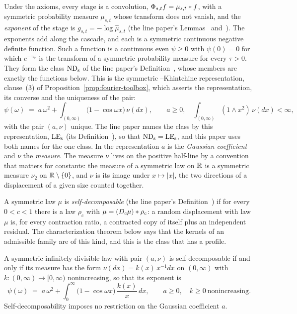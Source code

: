Under the axioms, every stage is a convolution, $\Phi_{s,t} f = \mu_{s,t} * f$, with a
symmetric probability measure $\mu_{s,t}$ whose transform does not vanish, and the
\emph{exponent} of the stage is $g_{s,t} = -\log\hat\mu_{s,t}$ (the line paper's
Lemmas~ and~). The
exponents add along the cascade, and each is a symmetric continuous negative definite
function. Such a function is a continuous even $\psi \ge 0$ with $\psi(0) = 0$ for which
$e^{-\tau\psi}$ is the transform of a symmetric probability measure for every $\tau > 0$.
They form the class $\mathrm{ND}_{\mathrm{s}}$ of the line paper's Definition~,
whose members are exactly the functions below. This is the symmetric \Levy--Khintchine
representation, clause~(3) of Proposition~\ref{prop:fourier-toolbox}, which asserts the
representation, its converse and the uniqueness of the pair:
\begin{equation}\label{eq:levy-khintchine}
  \psi(\omega) \;=\; a\,\omega^2 + \int_{(0,\infty)} \bigl(1 - \cos\omega x\bigr)\,\nu(dx),
  \qquad a \ge 0, \quad \int_{(0,\infty)} (1 \wedge x^2)\,\nu(dx) < \infty,
\end{equation}
with the pair $(a,\nu)$ unique. The line paper names the class by this representation,
$\mathrm{LE}_{\mathrm{s}}$ (its Definition~), so that $\mathrm{ND}_{\mathrm{s}} = \mathrm{LE}_{\mathrm{s}}$, and this paper
uses both names for the one class. In the representation $a$ is the
\emph{Gaussian coefficient} and $\nu$ the \emph{\Levy{} measure}. The measure $\nu$ lives on
the positive half-line by a convention that matters for constants: the \Levy{} measure of a
symmetric law on $\mathbb{R}$ is a symmetric measure $\nu_2$ on $\mathbb{R} \setminus \{0\}$, and $\nu$ is
its image under $x \mapsto |x|$, the two directions of a displacement of a given size counted
together.

A symmetric law $\mu$ is \emph{self-decomposable} (the line paper's
Definition~) if for every $0 < c < 1$ there is a law $\rho_c$ with
$\mu = (D_{c}\mu) * \rho_c$: a random displacement with law $\mu$ is, for every contraction
ratio, a contracted copy of itself plus an independent residual. The characterization theorem
below says that the kernels of an admissible family are of this kind, and this is the class
that has a profile.

\begin{proposition}\label{prop:sd-exponents}
A symmetric infinitely divisible law with pair $(a,\nu)$ is self-decomposable if and only if
its \Levy{} measure has the form $\nu(dx) = k(x)\,x^{-1}dx$ on $(0,\infty)$ with
$k : (0,\infty) \to [0,\infty)$ nonincreasing, so that its exponent is
\begin{equation}\label{eq:sd-profile}
  \psi(\omega) \;=\; a\,\omega^2
  + \int_0^\infty \bigl(1 - \cos\omega x\bigr)\,\frac{k(x)}{x}\,dx,
  \qquad a \ge 0, \quad k \ge 0 \ \text{nonincreasing}.
\end{equation}
Self-decomposability imposes no restriction on the Gaussian coefficient $a$.
\end{proposition}

